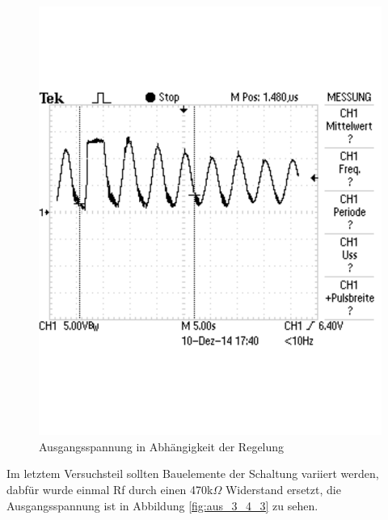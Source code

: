 \documentclass[12pt,a4paper]{article}
\begin{document}
\begin{figure}[H] 
  \centering
    \includegraphics[trim = 0mm 50mm 0mm 50mm, clip, scale = 0.6]{TEK0008.pdf}
  	\caption[Ausgangsspannung in Abhängigkeit der Regelung]{Ausgangsspannung in Abhängigkeit der Regelung}
  \label{fig:aus_3_4_2}
\end{figure}

Im letztem Versuchsteil sollten Bauelemente der Schaltung variiert werden, dabfür wurde einmal Rf durch einen 470k$\Omega$ Widerstand ersetzt, die Ausgangsspannung ist in Abbildung \ref{fig:aus_3_4_3} zu sehen.
\end{document}
